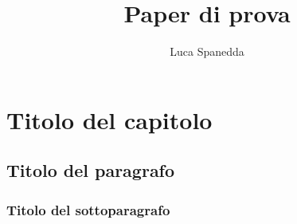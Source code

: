 \documentclass[12pt,a4paper]{book}
\begin{document}

\title{Paper di prova}
\author{Luca Spanedda}
\date{}
\maketitle


\chapter{Titolo del capitolo}
\section{Titolo del paragrafo}
\subsection{Titolo del sottoparagrafo}



\end{document}
